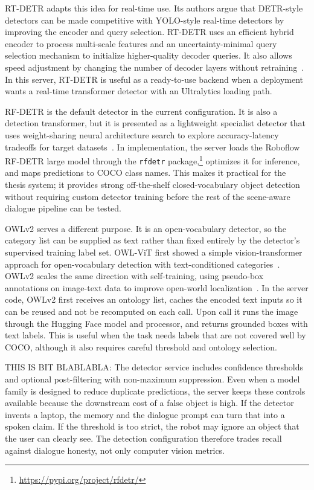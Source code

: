 RT-DETR adapts this idea for real-time use. Its authors argue that DETR-style detectors can be made competitive with YOLO-style real-time detectors by improving the encoder and query selection. RT-DETR uses an efficient hybrid encoder to process multi-scale features and an uncertainty-minimal query selection mechanism to initialize higher-quality decoder queries. It also allows speed adjustment by changing the number of decoder layers without retraining~\cite{zhao_detrs_2024}. In this server, RT-DETR is useful as a ready-to-use backend when a deployment wants a real-time transformer detector with an Ultralytics loading path.

RF-DETR is the default detector in the current configuration. It is also a detection transformer, but it is presented as a lightweight specialist detector that uses weight-sharing neural architecture search to explore accuracy-latency tradeoffs for target datasets~\cite{robinson_rf-detr_2026}. In implementation, the server loads the Roboflow RF-DETR large model through the \texttt{rfdetr} package,\footnote{\url{https://pypi.org/project/rfdetr/}} optimizes it for inference, and maps predictions to COCO class names. This makes it practical for the thesis system; it provides strong off-the-shelf closed-vocabulary object detection without requiring custom detector training before the rest of the scene-aware dialogue pipeline can be tested.

OWLv2 serves a different purpose. It is an open-vocabulary detector, so the category list can be supplied as text rather than fixed entirely by the detector's supervised training label set. OWL-ViT first showed a simple vision-transformer approach for open-vocabulary detection with text-conditioned categories~\cite{minderer_simple_2022}. OWLv2 scales the same direction with self-training, using pseudo-box annotations on image-text data to improve open-world localization~\cite{minderer_scaling_2024}. In the server code, OWLv2 first receives an ontology list, caches the encoded text inputs so it can be reused and not be recomputed on each call. Upon call it runs the image through the Hugging Face model and processor, and returns grounded boxes with text labels. This is useful when the task needs labels that are not covered well by COCO, although it also requires careful threshold and ontology selection.

THIS IS BIT BLABLABLA: The detector service includes confidence thresholds and optional post-filtering with non-maximum suppression. Even when a model family is designed to reduce duplicate predictions, the server keeps these controls available because the downstream cost of a false object is high. If the detector invents a laptop, the memory and the dialogue prompt can turn that into a spoken claim. If the threshold is too strict, the robot may ignore an object that the user can clearly see. The detection configuration therefore trades recall against dialogue honesty, not only computer vision metrics.

